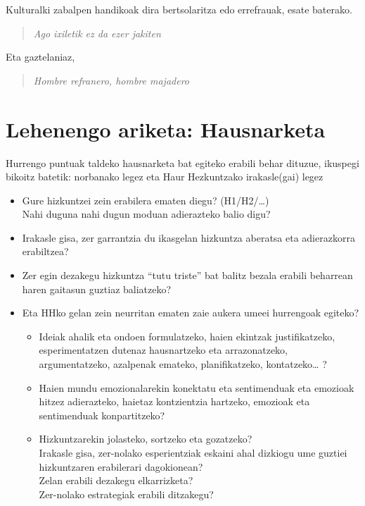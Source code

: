 \documentclass[
]{book}
\providecommand{\tightlist}{%
  \setlength{\itemsep}{0pt}\setlength{\parskip}{0pt}}
\begin{document}
Kulturalki zabalpen handikoak dira bertsolaritza edo errefrauak, esate baterako.

\begin{quote}
\emph{Ago ixiletik ez da ezer jakiten}
\end{quote}

Eta gaztelaniaz,

\begin{quote}
\emph{Hombre refranero, hombre majadero}
\end{quote}

\hypertarget{T1A1}{%
\section*{Lehenengo ariketa: Hausnarketa}\label{T1A1}}

Hurrengo puntuak taldeko hausnarketa bat egiteko erabili behar dituzue, ikuspegi bikoitz batetik: norbanako legez eta Haur Hezkuntzako irakasle(gai) legez

\begin{itemize}
\tightlist
\item
  Gure hizkuntzei zein erabilera ematen diegu? (H1/H2/\ldots)\\
  Nahi duguna nahi dugun moduan adierazteko balio digu?
\item
  Irakasle gisa, zer garrantzia du ikasgelan hizkuntza aberatsa eta adierazkorra erabiltzea?
\item
  Zer egin dezakegu hizkuntza ``tutu triste'' bat balitz bezala erabili beharrean haren gaitasun guztiaz baliatzeko?
\item
  Eta HHko gelan zein neurritan ematen zaie aukera umeei hurrengoak egiteko?

  \begin{itemize}
  \tightlist
  \item
    Ideiak ahalik eta ondoen formulatzeko, haien ekintzak justifikatzeko, esperimentatzen dutenaz hausnartzeko eta arrazonatzeko, argumentatzeko, azalpenak emateko, planifikatzeko, kontatzeko\ldots{} ?
  \item
    Haien mundu emozionalarekin konektatu eta sentimenduak eta emozioak hitzez adierazteko, haietaz kontzientzia hartzeko, emozioak eta sentimenduak konpartitzeko?
  \item
    Hizkuntzarekin jolasteko, sortzeko eta gozatzeko?\\
    Irakasle gisa, zer-nolako esperientziak eskaini ahal dizkiogu ume guztiei hizkuntzaren erabilerari dagokionean?\\
    Zelan erabili dezakegu elkarrizketa?\\
    Zer-nolako estrategiak erabili ditzakegu?
  \end{itemize}
\end{itemize}
\end{document}
